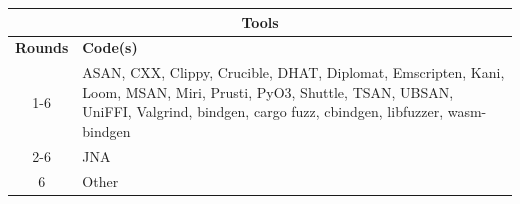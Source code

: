 \centering
\small
\begin{tabular}{|c|p{10cm}|}
\hline
\multicolumn{2}{|c|}{\textbf{Tools}}                                                                                                                                                                                                  \\ \hline
\multicolumn{1}{|c|}{\textbf{Rounds}} & \textbf{Code(s)}                                                                                                                                                                              \\ \hline
\multicolumn{1}{|c|}{1-6}             & ASAN, CXX, Clippy, Crucible, DHAT, Diplomat, Emscripten, Kani, Loom, MSAN, Miri, Prusti, PyO3, Shuttle, TSAN, UBSAN, UniFFI, Valgrind, bindgen, cargo fuzz, cbindgen, libfuzzer, wasm-bindgen \\ \hline
\multicolumn{1}{|c|}{2-6}             & JNA                                                                                                                                                                                           \\ \hline
\multicolumn{1}{|c|}{6}               & Other                                                                                                                                                                                         \\ \hline
\end{tabular}
